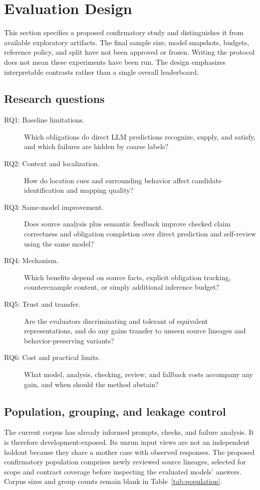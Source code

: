 \section{Evaluation Design}
\label{sec:evaluation}
This section specifies a proposed confirmatory study and distinguishes it from
available exploratory artifacts. The final sample size, model snapshots, budgets,
reference policy, and split have not been approved or frozen. Writing the protocol
does not mean these experiments have been run. The design emphasizes interpretable
contrasts rather than a single overall leaderboard.

\subsection{Research questions}
\begin{description}
\item[RQ1: Baseline limitations.] Which obligations do direct LLM predictions
recognize, supply, and satisfy, and which failures are hidden by coarse labels?
\item[RQ2: Context and localization.] How do location cues and surrounding
behavior affect candidate identification and mapping quality?
\item[RQ3: Same-model improvement.] Does source analysis plus semantic feedback
improve checked claim correctness and obligation completion over direct prediction
and self-review using the same model?
\item[RQ4: Mechanism.] Which benefits depend on source facts, explicit obligation
tracking, counterexample content, or simply additional inference budget?
\item[RQ5: Trust and transfer.] Are the evaluators discriminating and
tolerant of equivalent representations, and do any gains transfer to unseen source lineages and
behavior-preserving variants?
\item[RQ6: Cost and practical limits.] What model, analysis, checking, review,
and fallback costs accompany any gain, and when should the method abstain?
\end{description}

\subsection{Population, grouping, and leakage control}
The current corpus has already informed prompts, checks, and failure analysis.
It is therefore development-exposed. Its unrun input views are not an independent
holdout because they share a mother case with observed responses. The proposed
confirmatory population comprises newly reviewed source lineages, selected for
scope and contract coverage before inspecting the evaluated models' answers.
Corpus sizes and group counts remain blank in Table~\ref{tab:population}.

